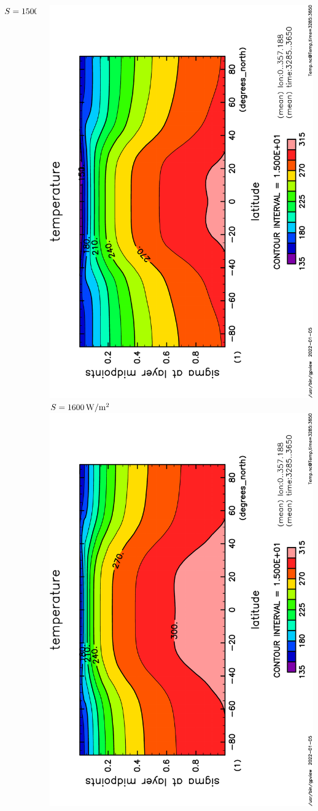 \documentclass[aspectratio=149,9pt,fleqn]{beamer}
\begin{document}
\begin{frame}
\begin{columns}[T]
\begin{column}{.3\textwidth}
			\(S=1500\hmu{W/m^2}\)
		\end{column}
		\begin{column}{.3\textwidth}
			\centering
			\includegraphics[height=\textwidth,angle=-90]{S1600/Temp,time=3285:3650-crop.pdf}
			\(S=1600\hmu{W/m^2}\)\\
			\includegraphics[height=\textwidth,angle=-90]{S1800/Temp,time=3285:3650-crop.pdf}

\end{column}
\end{columns}
\end{frame}
\end{document}
